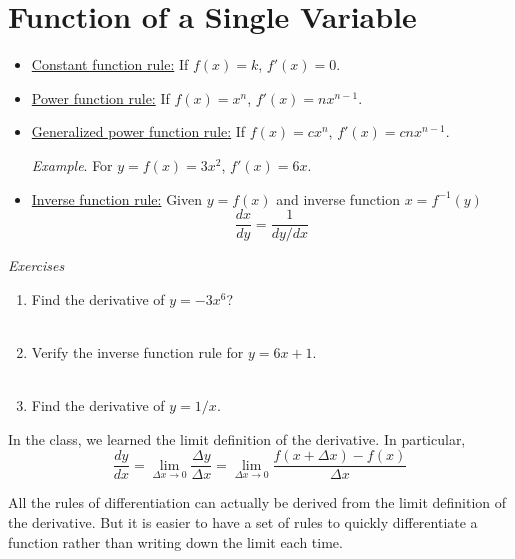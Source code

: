 \documentclass{./../../Latex/handout}
\begin{document}
\thispagestyle{plain}

\vspace{-2em}
\section*{Function of a Single Variable} 
\vspace{-1em}
\begin{itemize}
  \item \underline{Constant function rule:} If \(f(x)=k \), \( f'(x)=0 \). 
  \item \underline{Power function rule:} If \(f(x)=x^n \), \( f'(x)=n x^{n-1} \). 
  \item \underline{Generalized power function rule:} If \(f(x)=c x^{n} \), \( f'(x)=cn x^{n-1} \). 
  
  \textit{Example}. For $y=f(x) = 3x^2$, $f'(x)= 6x$.
  \item \underline{Inverse function rule:} Given $y = f(x)$ and inverse function $x = f^{-1}(y)$
$$
\frac{d x}{d y}=\frac{1}{d y/ d x}
$$ 
\end{itemize}
\textit{Exercises}
\begin{enumerate}
	\item Find the derivative of $y=-3x^6$? \\~\\ \vspace{1.25cm}
	\item Verify the inverse function rule for $y=6x+1$. \\~\\ \vspace{2.5cm}
	\item Find the derivative of $y=1/x$. 
\end{enumerate}
\newpage
In the class, we learned the limit definition of the derivative. In particular,
$$ \frac{d y}{d x}=\lim _{\Delta x \rightarrow 0} \frac{\Delta y}{\Delta x} =\lim _{\Delta x \rightarrow 0} \frac{f(x+\Delta x)-f(x)}{\Delta x} $$

All the rules of differentiation can actually be derived from the limit definition of the derivative. But it is easier to have a set of rules to quickly differentiate a function rather than writing down the limit each time. \\
\end{document}
